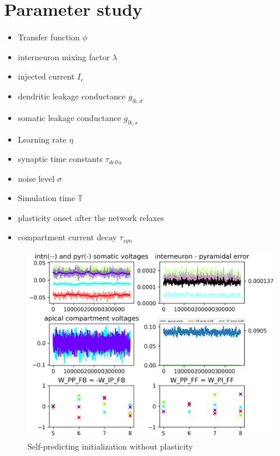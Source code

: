\documentclass[12pt,a4paper,titlepage]{report}
\begin{document}
\section{Parameter study}
\begin{itemize}

  \item Transfer function $\phi$
  \item interneuron mixing factor $\lambda$
  \item injected current $I_e$
  \item dendritic leakage conductance $g_{lk,d}$
  \item somatic leakage conductance $g_{lk,s}$
  \item Learning rate $\eta$
  \item synaptic time constants $\tau_{delta}$
  \item noise level $\sigma$
  \item Simulation time $\mathbb{T}$
  \item plasticity onset after the network relaxes
  \item compartment current decay $\tau_{syn}$

\end{itemize}



\begin{figure}
  \centerline{\includegraphics[width={1\linewidth}]{self_pred_static.png}}
  \caption{Self-predicting initialization without plasticity}
\end{figure}
\end{document}
